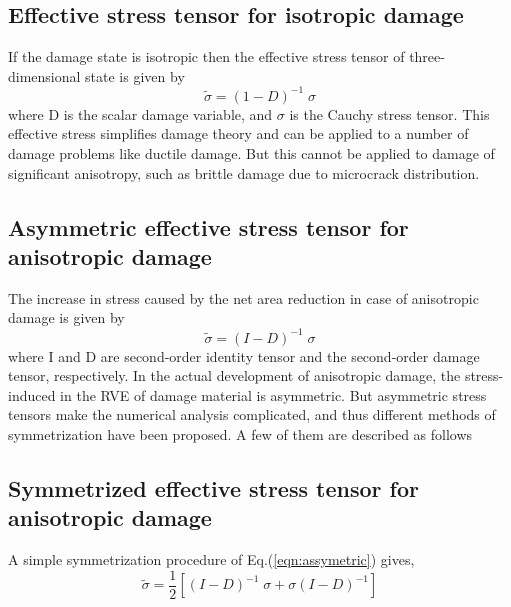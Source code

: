 \documentclass[12pt,openright,twoside]{report}
\begin{document}
\subsection{Effective stress tensor for isotropic damage \citep{lemaitre1978aspect}}
\indent\indent\indent If the damage state is isotropic then the effective stress tensor of three-dimensional state is given by
\begin{equation}
\tilde{\sigma} = (1 - D)^{-1} \; \sigma
\end{equation}
where D is the scalar damage variable, and $\sigma$ is the Cauchy stress tensor. This effective stress simplifies damage theory and can be applied to a number of damage problems like ductile damage. But this cannot be applied to damage of significant anisotropy, such as brittle damage due to microcrack distribution.\\
\subsection{Asymmetric effective stress tensor for anisotropic damage \citep{murakami2012continuum}}
\indent\indent\indent The increase in stress caused by the net area reduction in case of anisotropic damage is given by
\begin{equation}
\tilde{\sigma} = (I - D)^{-1} \; \sigma
\label{eqn:assymetric}
\end{equation}
where I and D are second-order identity tensor and the second-order damage tensor, respectively. In the actual development of anisotropic damage, the stress-induced in the RVE of damage material is asymmetric. But asymmetric stress tensors make the numerical analysis complicated, and thus different methods of symmetrization have been proposed. A few of them are described as follows

\subsection{Symmetrized effective stress tensor for anisotropic damage \citep{murakami2012continuum}} 
\indent\indent\indent A simple symmetrization procedure of Eq.(\ref{eqn:assymetric}) gives,
\begin{equation}
\label{eqn: Murakami and Ohno}
\tilde{\sigma} = \frac{1}{2} [(I - D)^{-1}\;\sigma + \sigma(I - D)^{-1}]
\end{equation}
\end{document}
